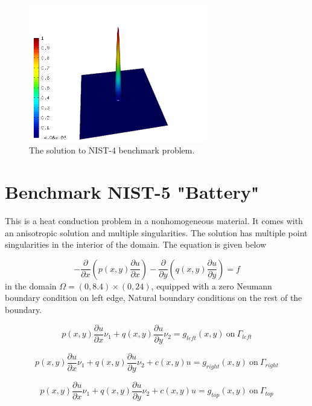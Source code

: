 \documentclass[12pt]{elsarticle}
\begin{document}
\begin{figure}[!ht]
\centering
\includegraphics[height=6cm]{nist/nist-4/solution.png}
\caption{The solution to NIST-4 benchmark problem.}
\label{fig:sln-nist04}
\end{figure}

\section{Benchmark NIST-5 "Battery"}
\label{sec:bench-5}

This is a heat conduction problem in a nonhomogeneous material. It comes with an anisotropic solution and
multiple singularities. The solution has multiple point singularities in the interior of the domain.
The equation is given below

\begin{equation} \label{heat-conduction}
-\frac{\partial }{\partial x}\left(p(x, y)\frac{\partial u}{\partial x}\right)
-\frac{\partial }{\partial y}\left(q(x, y)\frac{\partial u}{\partial y}\right) = f
\end{equation}
in the domain $\Omega = (0, 8.4) \times (0, 24)$, equipped with
a zero Neumann boundary condition on left edge, Natural boundary conditions on the rest of the boundary.

\begin{equation}
p(x, y)\frac{\partial u}{\partial x}\nu_1 + q(x, y)\frac{\partial u}{\partial y}\nu_2 = g_{left}(x, y) \ \mbox{on} \  \Gamma_{left}
\end{equation}

\begin{equation}
p(x, y)\frac{\partial u}{\partial x}\nu_1 + q(x, y)\frac{\partial u}{\partial y}\nu_2 + c(x, y)u = g_{right}(x, y) \ \mbox{on} \ \Gamma_{right}
\end{equation}

\begin{equation}
p(x, y)\frac{\partial u}{\partial x}\nu_1 + q(x, y)\frac{\partial u}{\partial y}\nu_2 + c(x, y)u = g_{top}(x, y) \ \mbox{on} \ \Gamma_{top}
\end{equation}
\end{document}
